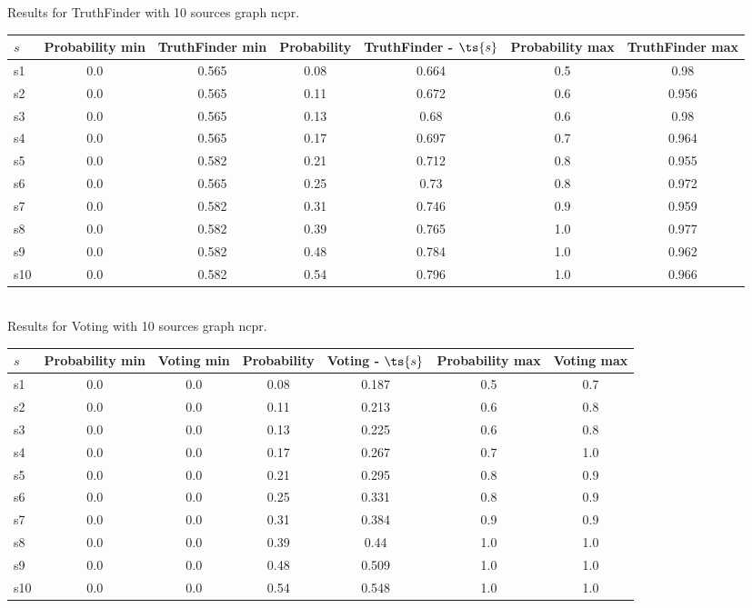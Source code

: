 \documentclass{article}
\begin{document}
\noindent Results for TruthFinder with 10 sources graph ncpr.

\noindent\begin{tabular}{|l|c|c|c|c|c|c|}
\hline
$s$& Probability min & TruthFinder min & Probability & TruthFinder - $\ts{s}$ & Probability max & TruthFinder max\\
\hline
s1 &0.0 & 0.565 & 0.08 & 0.664 & 0.5 & 0.98\\
\hline
s2 &0.0 & 0.565 & 0.11 & 0.672 & 0.6 & 0.956\\
\hline
s3 &0.0 & 0.565 & 0.13 & 0.68 & 0.6 & 0.98\\
\hline
s4 &0.0 & 0.565 & 0.17 & 0.697 & 0.7 & 0.964\\
\hline
s5 &0.0 & 0.582 & 0.21 & 0.712 & 0.8 & 0.955\\
\hline
s6 &0.0 & 0.565 & 0.25 & 0.73 & 0.8 & 0.972\\
\hline
s7 &0.0 & 0.582 & 0.31 & 0.746 & 0.9 & 0.959\\
\hline
s8 &0.0 & 0.582 & 0.39 & 0.765 & 1.0 & 0.977\\
\hline
s9 &0.0 & 0.582 & 0.48 & 0.784 & 1.0 & 0.962\\
\hline
s10 &0.0 & 0.582 & 0.54 & 0.796 & 1.0 & 0.966\\
\hline
\end{tabular}\\

\noindent Results for Voting with 10 sources graph ncpr.

\noindent\begin{tabular}{|l|c|c|c|c|c|c|}
\hline
$s$& Probability min & Voting min & Probability & Voting - $\ts{s}$ & Probability max & Voting max\\
\hline
s1 &0.0 & 0.0 & 0.08 & 0.187 & 0.5 & 0.7\\
\hline
s2 &0.0 & 0.0 & 0.11 & 0.213 & 0.6 & 0.8\\
\hline
s3 &0.0 & 0.0 & 0.13 & 0.225 & 0.6 & 0.8\\
\hline
s4 &0.0 & 0.0 & 0.17 & 0.267 & 0.7 & 1.0\\
\hline
s5 &0.0 & 0.0 & 0.21 & 0.295 & 0.8 & 0.9\\
\hline
s6 &0.0 & 0.0 & 0.25 & 0.331 & 0.8 & 0.9\\
\hline
s7 &0.0 & 0.0 & 0.31 & 0.384 & 0.9 & 0.9\\
\hline
s8 &0.0 & 0.0 & 0.39 & 0.44 & 1.0 & 1.0\\
\hline
s9 &0.0 & 0.0 & 0.48 & 0.509 & 1.0 & 1.0\\
\hline
s10 &0.0 & 0.0 & 0.54 & 0.548 & 1.0 & 1.0\\
\hline
\end{tabular}\\
\end{document}
